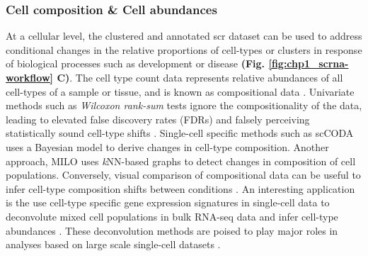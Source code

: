 \subsubsection{Cell composition \& Cell abundances}
At a cellular level, the clustered and annotated \gls{scr} dataset can be used to address conditional changes in the relative proportions of cell-types or clusters in response of biological processes such as development or disease \textbf{(Fig. \ref{fig:chp1_scrna-workflow} C)}. %
The cell type count data represents relative abundances of all cell-types of a sample or tissue, and is known as compositional data \textbf{\cite{noauthor_compositional_nodate}}. Univariate methods such as \textit{Wilcoxon rank-sum} tests ignore the compositionality of the data, leading to elevated false discovery rates (FDRs) and falsely perceiving statistically sound cell-type shifts \textbf{\cite{noauthor_compositional_nodate}}. Single-cell specific methods such as scCODA \textbf{\cite{buttner_sccoda_2021}} uses a Bayesian model to derive changes in cell-type composition. Another approach, MILO \textbf{\cite{dann_differential_2022}} uses \textit{k}NN-based graphs to detect changes in composition of cell populations. Conversely, visual comparison of compositional data can be useful to infer cell-type composition shifts between conditions \textbf{\cite{lueckenmalte_d_current_2019}}. An interesting application is the use cell-type specific gene expression signatures in single-cell data to deconvolute mixed cell populations in bulk RNA-seq data and infer cell-type abundances \textbf{\cite{newman_robust_2015,newman_determining_2019,chu_cell_2022}}. These deconvolution methods are poised to play major roles in analyses based on large scale single-cell datasets \textbf{\cite{cobos_effective_2023}}. 

